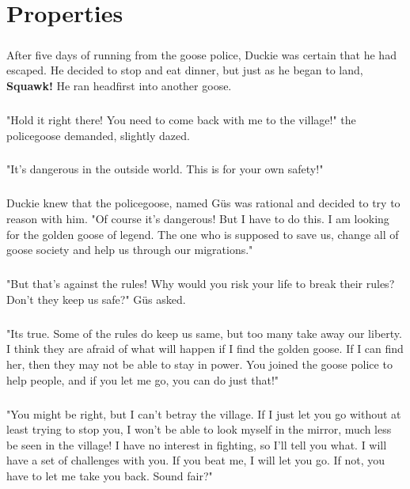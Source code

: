\chapter{Properties}
\paragraph{} After five days of running from the goose police, Duckie was certain that he had escaped. He decided to stop and eat dinner, but just as he began to land, \textbf{Squawk!} He ran headfirst into another goose. 
\paragraph{} "Hold it right there! You need to come back with me to the village!" the policegoose demanded, slightly dazed. 
\paragraph{} "It's dangerous in the outside world. This is for your own safety!"
\paragraph{} Duckie knew that the policegoose, named Güs was rational and decided to try to reason with him. "Of course it's dangerous! But I have to do this. I am looking for the golden goose of legend. The one who is supposed to save us, change all of goose society and help us through our migrations."
\paragraph{} "But that's against the rules! Why would you risk your life to break their rules? Don't they keep us safe?" Güs asked.
\paragraph{} "Its true. Some of the rules do keep us same, but too many take away our liberty. I think they are afraid of what will happen if I find the golden goose. If I can find her, then they may not be able to stay in power. You joined the goose police to help people, and if you let me go, you can do just that!"
\paragraph{} "You might be right, but I can't betray the village. If I just let you go without at least trying to stop you, I won't be able to look myself in the mirror, much less be seen in the village! I have no interest in fighting, so I'll tell you what. I will have a set of challenges with you. If you beat me, I will let you go. If not, you have to let me take you back. Sound fair?"
